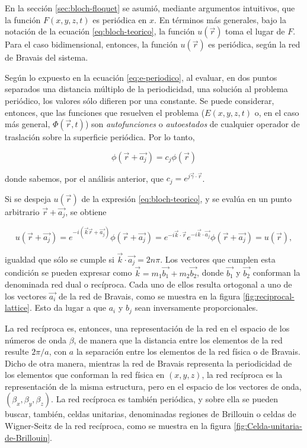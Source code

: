 En la sección \ref{sec:bloch-floquet} se asumió, mediante argumentos intuitivos, que la función $F(x,y,z,t)$ es periódica en $x$. En términos más generales, bajo la notación de la ecuación \ref{eq:bloch-teorico}, la función $u(\vec{r})$ toma el lugar de $F$. Para el caso bidimensional, entonces, la función $u(\vec{r})$ es periódica, según la red de Bravais del sistema. 

Según lo expuesto en la ecuación \ref{eq:e-periodico}, al evaluar, en dos puntos separados una distancia múltiplo de la periodicidad, una solución al problema periódico, los valores sólo difieren por una constante. Se puede considerar, entonces, que las funciones que resuelven el problema ($E(x,y,z,t)$ o, en el caso más general, $\Phi(\vec{r},t)$) son \textit{autofunciones} o \textit{autoestados} de cualquier operador de traslación sobre la superficie periódica. Por lo tanto,

\begin{equation}
	\phi(\vec{r}+\vec{a_j}) = c_j \phi(\vec{r})
\end{equation}

donde sabemos, por el análisis anterior, que $c_j = e^{j\vec{\gamma}\cdot\vec{r}}$.

Si se despeja $u(\vec{r})$ de la expresión \ref{eq:bloch-teorico}, y se evalúa en un punto arbitrario $\vec{r}+\vec{a_j}$, se obtiene

\begin{equation}
	u(\vec{r}+\vec{a_j}) = e^{-i( \vec{k}{\vec{r}+\vec{a_j}})}\phi(\vec{r}+\vec{a_j}) = e^{-i\vec{k}\cdot\vec{r}} e^{-i\vec{k}\cdot\vec{a_j}}\phi(\vec{r}+\vec{a_j}) = u(\vec{r}),
\end{equation}

igualdad que sólo se cumple si $\vec{k} \cdot \vec{a_j} = 2n\pi$. Los vectores que cumplen esta condición se pueden expresar como $\vec{k} = m_1 \vec{b_1} + m_2 \vec{b_2}$, donde $\vec{b_1}$ y $\vec{b_2}$ conforman la denominada red dual o recíproca. Cada uno de ellos resulta ortogonal a uno de los vectores $\vec{a_i}$ de la red de Bravais, como se muestra en la figura \ref{fig:reciprocal-lattice}. Esto da lugar a que $a_i$ y $b_j$ sean inversamente proporcionales.

La red recíproca es, entonces, una representación de la red en el espacio de los números de onda $\beta$, de manera que la distancia entre los elementos de la red resulte $2\pi/a$, con $a$ la separación entre los elementos de la red física o de Bravais. Dicho de otra manera, mientras la red de Bravais representa la periodicidad de los elementos que conforman la red física en $(x,y,z)$, la red recíproca es la representación de la misma estructura, pero en el espacio de los vectores de onda, $(\beta_x, \beta_y, \beta_z)$. La red recíproca es también periódica, y sobre ella se pueden buscar, también, celdas unitarias, denominadas regiones de Brillouin o celdas de Wigner-Seitz de la red recíproca, como se muestra en la figura \ref{fig:Celda-unitaria-de-Brillouin}.

